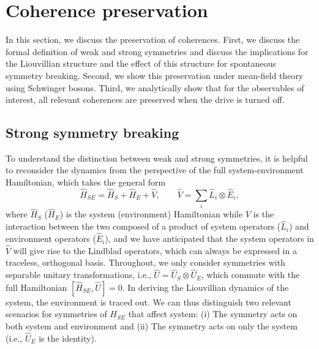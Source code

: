 \documentclass[11pt]{article}
\begin{document}
\section{Coherence preservation}
\label{sec:coherence}

In this section, we discuss the preservation of coherences. First, we discuss the formal definition of weak and strong symmetries and discuss the implications for the Liouvillian structure and the effect of this structure for spontaneous symmetry breaking. Second, we show this preservation under mean-field theory using Schwinger bosons. Third, we analytically show that for the observables of interest, all relevant coherences are preserved when the drive is turned off.

\subsection{Strong symmetry breaking}

To understand the distinction between weak and strong symmetries, it is helpful to reconsider the dynamics from the perspective of the full system-environment Hamiltonian, which takes the general form
\begin{equation}
    \hat H_{SE} = \hat H_S + \hat H_E + \hat V, \qquad \hat V = \sum_i \hat L_i \otimes \hat E_i,
\end{equation}
where $\hat H_S$ ($\hat H_E$) is the system (environment) Hamiltonian while $V$ is the interaction between the two composed of a product of system operators ($\hat L_i$) and environment operators ($\hat E_i$), and we have anticipated that the system operators in $\hat V$ will give rise to the Lindblad operators, which can always be expressed in a traceless, orthogonal basis.
Throughout, we only consider symmetries with separable unitary transformations, i.e., $\hat U = \hat U_S \otimes \hat U_E$, which commute with the full Hamiltonian $[\hat H_{SE}, \hat U] = 0$. In deriving the Liouvillian dynamics of the system, the environment is traced out. We can thus distinguish two relevant scenarios for symmetries of $H_{SE}$ that affect system: (i) The symmetry acts on both system and environment and (ii) The symmetry acts on only the system (i.e., $\hat U_E$ is the identity). 
\end{document}
